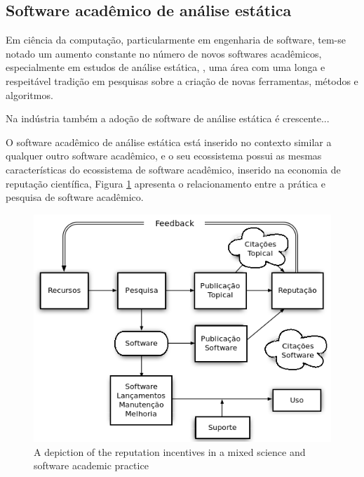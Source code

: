 

\subsection{Software acadêmico de análise estática}

Em ciência da computação, particularmente em engenharia de software, tem-se
notado um aumento constante no número de novos softwares acadêmicos,
especialmente em estudos de análise estática,
\cite{allen2017engineering}, uma área com uma longa e respeitável tradição em
pesquisas sobre a criação de novas ferramentas, métodos e algoritmos.

Na indústria também a adoção de software de análise estática é crescente...

O software acadêmico de análise estática está inserido no contexto similar
a qualquer outro software acadêmico, e o seu ecossistema possui as mesmas
características do ecossistema de software acadêmico, inserido na economia
de reputação científica, Figura \ref{scientific-reputation-diagram} apresenta
o relacionamento entre a prática e pesquisa de software acadêmico.

\begin{figure}[h]
  \center
  \includegraphics[scale=0.5]{imagens/scientific-reputation-diagram-dia.png}
  \caption{A depiction of the reputation incentives in a mixed science and software academic practice \cite{howison2011scientific}}
  \label{scientific-reputation-diagram}
\end{figure}


